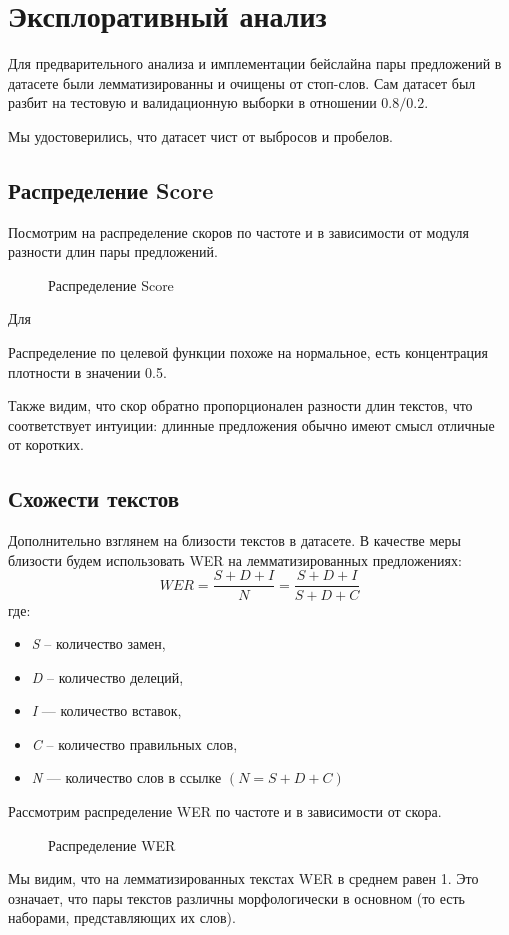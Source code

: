 \documentclass[12pt]{article}
\newcommand{\imgh}[3]
{
\begin{figure}[h]
\center{\texttt{[image: \#2]}}
\caption{#3}
\label{ris:#2}
\end{figure}
}
\begin{document}
\newpage

\section{Эксплоративный анализ}
Для предварительного анализа и имплементации бейслайна пары предложений в датасете были лемматизированны и очищены от стоп-слов. Сам датасет был разбит на тестовую и валидационную выборки в отношении $0.8 / 0.2$.

Мы удостоверились, что датасет чист от выбросов и пробелов.

\subsection{Распределение Score}
Посмотрим на распределение скоров по частоте и в зависимости от модуля разности длин пары предложений.
\imgh{17cm}{score_distribution.png}{Распределение Score}
Для


Распределение по целевой функции похоже на нормальное, есть концентрация плотности в значении 0.5. 

Также видим, что скор обратно пропорционален разности длин текстов, что соответствует интуиции: длинные предложения обычно имеют смысл отличные от коротких.
\newpage

\subsection{Схожести текстов}
Дополнительно взглянем на близости текстов в датасете. В качестве меры близости будем использовать WER на лемматизированных предложениях:
$$ WER = \frac{S + D + I}{N} =  \frac{S + D + I}{S + D + C}$$
где:
\begin{itemize}
    \item \textit{S} – количество замен,
    \item \textit{D} – количество делеций,
    \item \textit{I} — количество вставок,
    \item \textit{C} – количество правильных слов,
    \item \textit{N} — количество слов в ссылке $(N = S + D + C)$
\end{itemize}

Рассмотрим распределение WER по частоте и в зависимости от скора. 

\imgh{17cm}{wer_distribution.png}{Распределение WER}

Мы видим, что на лемматизированных текстах WER в среднем равен 1. Это означает, что пары текстов различны морфологически в основном (то есть наборами, представляющих их слов).
\end{document}
